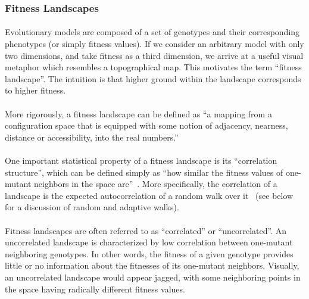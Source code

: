\documentclass[12pt,letterpaper,titlepage]{article}
\begin{document}

\subsubsection{Fitness Landscapes}

\paragraph{}
Evolutionary models are composed of a set of genotypes and their corresponding
phenotypes (or simply fitness values).  If we consider an arbitrary model with
only two dimensions, and take fitness as a third dimension, we arrive at a
useful visual metaphor which resembles a topographical map. This motivates the
term ``fitness landscape''. The intuition is that higher ground within the
landscape corresponds to higher fitness.~\cite{Wright1932}

\paragraph{}
More rigorously, a fitness landscape can be defined as ``a mapping from a
configuration space that is equipped with some notion of adjacency, nearness,
distance or accessibility, into the real numbers.''~\cite{Calcott2008}

\paragraph{}
One important statistical property of a fitness landscape is its ``correlation
structure'', which can be defined simply as ``how similar the fitness values of
one-mutant neighbors in the space are''~\cite{Kauffman1993}. More specifically,
the correlation of a landscape is the expected autocorrelation of a random walk
over it~\cite{Weinberger1990} (see below for a discussion of random and
adaptive walks).

\paragraph{}
Fitness landscapes are often referred to as ``correlated'' or ``uncorrelated''.
An uncorrelated landscape is characterized by low correlation between
one-mutant neighboring genotypes. In other words, the fitness of a given
genotype provides little or no information about the fitnesses of its
one-mutant neighbors. Visually, an uncorrelated landscape would appear jagged,
with some neighboring points in the space having radically different fitness
values.
\end{document}

